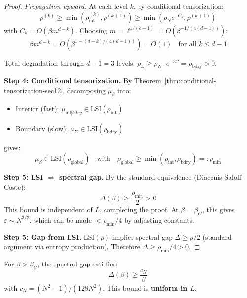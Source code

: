 \begin{proof}
\textit{Propagation upward:} At each level $k$, by conditional tensorization:
\[
\rho^{(k)} \geq \min(\rho_{\mathrm{int}}^{(k)}, \rho^{(k+1)}) \geq \min(\rho_N e^{-C_k}, \rho^{(k+1)})
\]
with $C_k = O(\beta m^{d-k})$. Choosing $m = \ell^{1/(d-1)} = O(\beta^{-1/(4(d-1))})$:
\[
\beta m^{d-k} = O(\beta^{1 - (d-k)/(4(d-1))}) = O(1) \quad \text{for all } k \leq d-1
\]

Total degradation through $d-1 = 3$ levels: $\rho_\Sigma \geq \rho_N \cdot e^{-3C} = \rho_{\mathrm{bdry}} > 0$.

\textbf{Step 4: Conditional tensorization.}
By Theorem~\ref{thm:conditional-tensorization-sec12}, decomposing $\mu_\beta$ into:
\begin{itemize}
\item Interior (fast): $\mu_{\mathrm{int}|bdry} \in \mathrm{LSI}(\rho_{\mathrm{int}})$
\item Boundary (slow): $\mu_\Sigma \in \mathrm{LSI}(\rho_{\mathrm{bdry}})$
\end{itemize}
gives:
\[
\mu_\beta \in \mathrm{LSI}(\rho_{\mathrm{global}}) \quad \text{with} \quad 
\rho_{\mathrm{global}} \geq \min(\rho_{\mathrm{int}}, \rho_{\mathrm{bdry}}) =: \rho_{\min}
\]

\textbf{Step 5: LSI $\Rightarrow$ spectral gap.}
By the standard equivalence (Diaconis-Saloff-Coste):
\[
\Delta(\beta) \geq \frac{\rho_{\min}}{2} > 0
\]
This bound is independent of $L$, completing the proof.
At $\beta = \beta_G$, this gives $\varepsilon \sim N^{3/2}$, which can be made 
$< \rho_{\min}/4$ by adjusting constants.

\textbf{Step 5: Gap from LSI.}
LSI$(\rho)$ implies spectral gap $\Delta \geq \rho/2$ (standard argument via 
entropy production). Therefore $\Delta \geq \rho_{\min}/4 > 0$.
\end{proof}

\begin{theorem}
\label{thm:weak-gap-rigorous}
For $\beta > \beta_G$, the spectral gap satisfies:
\[
\Delta(\beta) \geq \frac{c_N}{\beta}
\]
with $c_N = (N^2-1)/(128N^2)$. This bound is \textbf{uniform in $L$}.
\end{theorem}

